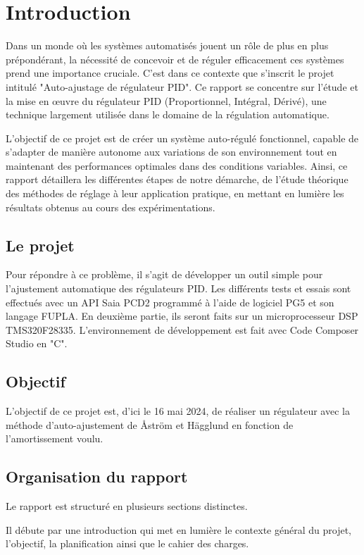 \section{Introduction}

Dans un monde où les systèmes automatisés jouent un rôle de plus en plus prépondérant, la nécessité de concevoir et de réguler efficacement ces systèmes prend une importance cruciale. C'est dans ce contexte que s'inscrit le projet intitulé "Auto-ajustage de régulateur PID". Ce rapport se concentre sur l'étude et la mise en œuvre du régulateur PID (Proportionnel, Intégral, Dérivé), une technique largement utilisée dans le domaine de la régulation automatique.

L'objectif de ce projet est de créer un système auto-régulé fonctionnel, capable de s'adapter de manière autonome aux variations de son environnement tout en maintenant des performances optimales dans des conditions variables. Ainsi, ce rapport détaillera les différentes étapes de notre démarche, de l'étude théorique des méthodes de réglage à leur application pratique, en mettant en lumière les résultats obtenus au cours des expérimentations.

\subsection{Le projet}
Pour répondre à ce problème, il s'agit de développer un outil simple pour l'ajustement automatique des régulateurs PID. Les différents tests et essais sont effectués avec un API Saia PCD2 programmé à l'aide de logiciel PG5 et son langage FUPLA. En deuxième partie, ils seront faits sur un microprocesseur DSP TMS320F28335. L'environnement de développement est fait avec Code Composer Studio en "C".
\subsection{Objectif}
L'objectif de ce projet est, d'ici le 16 mai 2024, de réaliser un régulateur avec la méthode d'auto-ajustement de Åström et Hägglund en fonction de l'amortissement voulu.


\subsection{Organisation du rapport}
Le rapport est structuré en plusieurs sections distinctes.

Il débute par une introduction qui met en lumière le contexte général du projet, l'objectif, la planification ainsi que le cahier des charges.

